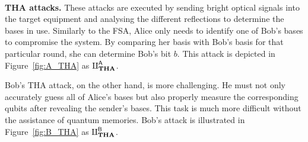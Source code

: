 \

\noindent\textbf{THA attacks.} These attacks are executed by sending bright optical signals into the target equipment and analysing the different reflections to determine the bases in use. Similarly to the FSA, Alice only needs to identify one of Bob's bases to compromise the system. By comparing her basis with Bob's basis for that particular round, she can determine Bob's bit $b$. This attack is depicted in Figure~\ref{fig:A_THA} as $\rotPi^{\mathsf{A}}_{\textbf{THA}}$.

Bob's THA attack, on the other hand, is more challenging. He must not only accurately guess all of Alice's bases but also properly measure the corresponding qubits after revealing the sender's bases. This task is much more difficult without the assistance of quantum memories. Bob's attack is illustrated in Figure~\ref{fig:B_THA} as $\rotPi^{\mathsf{B}}_{\textbf{THA}}$.








